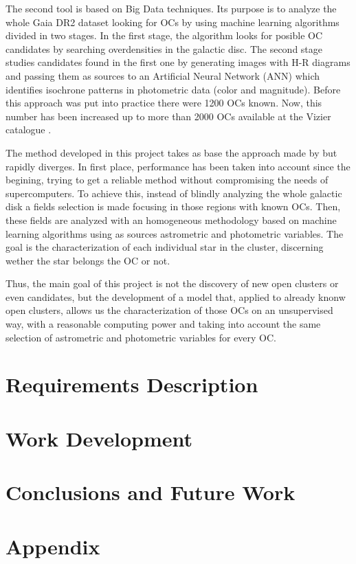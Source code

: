 \documentclass[11pt, a4paper, english]{book}
\begin{document}
The second tool is based on Big Data techniques. Its purpose is to analyze the whole Gaia DR2 dataset looking for OCs by using
machine learning algorithms divided in two stages. In the first stage, the algorithm looks for posible OC candidates by searching
overdensities in the galactic disc.
The second stage studies candidates found in the first one by generating images with H-R diagrams and passing them
as sources to an Artificial Neural Network (ANN) which identifies isochrone patterns in photometric data (color and magnitude).
Before this approach was put into practice there were 1200 OCs known. Now, this number has been increased up to more than 2000 OCs
available at the Vizier catalogue \cite{ochsenbein2000vizier}.

The method developed in this project takes as base the approach made by \citeauthor{castro2020hunting} but rapidly diverges.
In first place, performance has been taken into account since the begining, trying to get a reliable method without compromising the
needs of supercomputers.
To achieve this, instead of blindly analyzing the whole galactic disk a fields selection is made focusing in those regions with known OCs.
Then, these fields are analyzed with an homogeneous methodology based on machine learning algorithms using as sources astrometric and
photometric variables. The goal is the characterization of each individual star in the cluster, discerning wether the star belongs the OC
or not.

Thus, the main goal of this project is not the discovery of new open clusters or even candidates, but the development of a model that,
applied to already knonw open clusters, allows us the characterization of those OCs on an unsupervised way, with a reasonable computing
power and taking into account the same selection of astrometric and photometric variables for every OC.

\chapter{Requirements Description}

\chapter{Work Development}

\chapter{Conclusions and Future Work}



\appendix
\chapter{Appendix}

\end{document}
